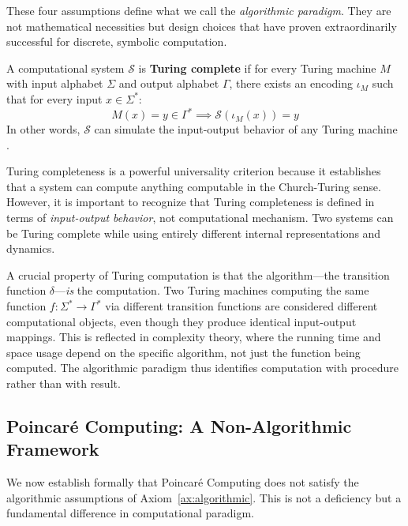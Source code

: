 These four assumptions define what we call the \textit{algorithmic paradigm}. They are not mathematical necessities but design choices that have proven extraordinarily successful for discrete, symbolic computation.

\begin{definition}
\label{def:turing_complete}
A computational system $\mathcal{S}$ is \textbf{Turing complete} if for every Turing machine $M$ with input alphabet $\Sigma$ and output alphabet $\Gamma$, there exists an encoding $\iota_M$ such that for every input $x \in \Sigma^*$:
\begin{equation}
M(x) = y \in \Gamma^* \implies \mathcal{S}(\iota_M(x)) = y
\label{eq:turing_complete}
\end{equation}
In other words, $\mathcal{S}$ can simulate the input-output behavior of any Turing machine \citep{sipser2012introduction}.
\end{definition}

Turing completeness is a powerful universality criterion because it establishes that a system can compute anything computable in the Church-Turing sense. However, it is important to recognize that Turing completeness is defined in terms of \textit{input-output behavior}, not computational mechanism. Two systems can be Turing complete while using entirely different internal representations and dynamics.

\begin{remark}
\label{rem:algorithm_as_computation}
A crucial property of Turing computation is that the algorithm—the transition function $\delta$—\textit{is} the computation. Two Turing machines computing the same function $f: \Sigma^* \to \Gamma^*$ via different transition functions are considered different computational objects, even though they produce identical input-output mappings. This is reflected in complexity theory, where the running time and space usage depend on the specific algorithm, not just the function being computed. The algorithmic paradigm thus identifies computation with procedure rather than with result.
\end{remark}

\subsection{Poincaré Computing: A Non-Algorithmic Framework}

We now establish formally that Poincaré Computing does not satisfy the algorithmic assumptions of Axiom~\ref{ax:algorithmic}. This is not a deficiency but a fundamental difference in computational paradigm.

